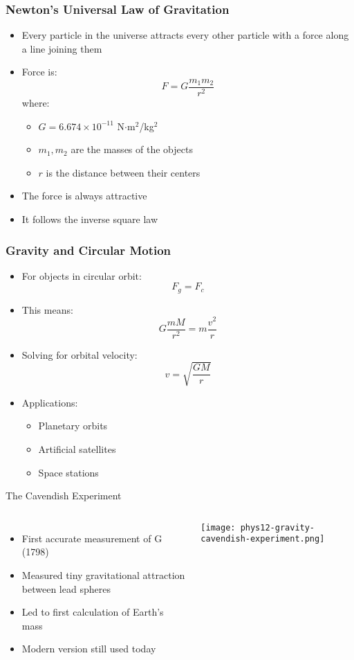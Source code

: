 \documentclass{beamer}
\begin{document}
\begin{frame}
\frametitle{Newton's Universal Law of Gravitation}
\begin{itemize}
    \item Every particle in the universe attracts every other particle with a force along a line joining them
    \item Force is:
        \[ F = G\frac{m_1m_2}{r^2} \]
    where:
    \begin{itemize}
        \item $G = 6.674 \times 10^{-11}$ N$\cdot$m$^2$/kg$^2$
        \item $m_1, m_2$ are the masses of the objects
        \item $r$ is the distance between their centers
    \end{itemize}
    \item The force is always attractive
    \item It follows the inverse square law
\end{itemize}
\end{frame}

\begin{frame}
\frametitle{Gravity and Circular Motion}
\begin{itemize}
    \item For objects in circular orbit:
        \[ F_g = F_c \]
    \item This means:
        \[ G\frac{mM}{r^2} = m\frac{v^2}{r} \]
    \item Solving for orbital velocity:
        \[ v = \sqrt{\frac{GM}{r}} \]
    \item Applications:
    \begin{itemize}
        \item Planetary orbits
        \item Artificial satellites
        \item Space stations
    \end{itemize}
\end{itemize}
\end{frame}

\begin{frame}{The Cavendish Experiment}
    \begin{columns}
        \begin{itemize}
            \item First accurate measurement of G (1798)
            \item Measured tiny gravitational attraction between lead spheres
            \item Led to first calculation of Earth's mass
            \item Modern version still used today
        \end{itemize}
        \texttt{[image: phys12-gravity-cavendish-experiment.png]}
    \end{columns}
\end{frame}
\end{document}
